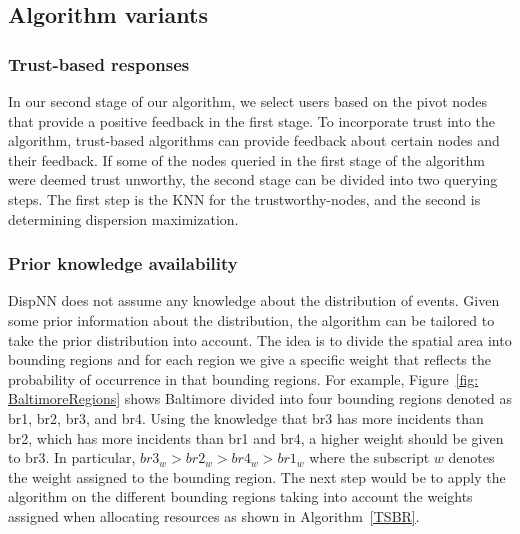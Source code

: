 \documentclass{acm_proc_article-sp}
\begin{document}
\subsection{Algorithm variants}
\subsubsection{Trust-based responses}
In our second stage of our algorithm, we select users based on the pivot nodes that provide a positive feedback in the first stage. To incorporate trust into the algorithm, trust-based algorithms can provide feedback about certain nodes and their feedback. If some of the nodes queried in the first stage of the algorithm were deemed trust unworthy, the second stage can be divided into two querying steps. The first step is the KNN for the trustworthy-nodes, and the second is determining dispersion maximization.
\subsubsection{Prior knowledge availability}
DispNN does not assume any knowledge about the distribution of events. Given some prior information about the distribution, the algorithm can be tailored to take the prior distribution into account. The idea is to divide the spatial area into bounding regions and for each region we give a specific weight that reflects the probability of occurrence in that bounding regions.
For example, Figure~\ref{fig: BaltimoreRegions} shows Baltimore divided into four bounding regions denoted as br1, br2, br3, and br4. Using the knowledge that br3 has more incidents than br2, which has more incidents than br1 and br4, a higher weight should be given to br3. In particular, $br3_w > br2_w> br4_w> br1_w$ where the subscript $w$ denotes the weight assigned to the bounding region. The next step would be to apply the algorithm on the different bounding regions taking into account the weights assigned when allocating resources as shown in Algorithm~\ref{TSBR}.
\end{document}
